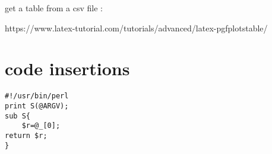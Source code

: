 \documentclass{article}
\begin{document}
get a table from a csv file :

https://www.latex-tutorial.com/tutorials/advanced/latex-pgfplotstable/


\section{code insertions}


\begin{lstlisting}
#!/usr/bin/perl
print S(@ARGV);
sub S{
	$r=@_[0];
return $r;
}
\end{lstlisting}

%


 \begin{appendix}
  \listoffigures
  \listoftables
 \end{appendix}

\end{document}
